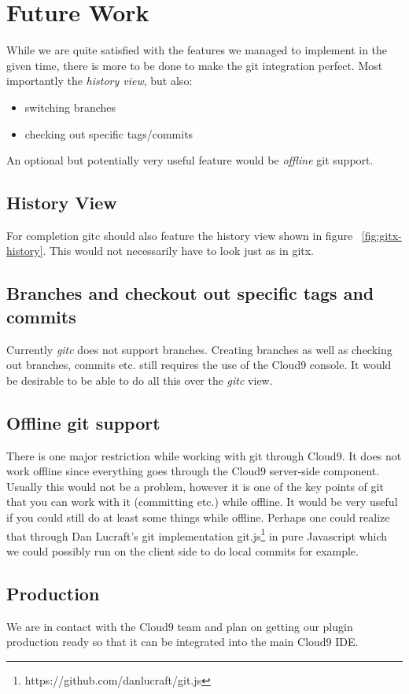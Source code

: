 \section{Future Work}
\label{sec:Future_Work}

While we are quite satisfied with the features we managed to implement in the given time,
there is more to be done to make the git integration perfect.
Most importantly the \emph{history view}, but also:
\begin{itemize}
	\item switching branches
	\item checking out specific tags/commits
\end{itemize}
An optional but potentially very useful feature would be \emph{offline} git support.

\subsection{History View}
\label{sec:history-view}

For completion gitc should also feature the history view shown in figure ~\ref{fig:gitx-history}.
This would not necessarily have to look just as in gitx.

\subsection{Branches and checkout out specific tags and commits}
\label{sec:branches}

Currently \emph{gitc} does not support branches. Creating branches as well as checking out branches,
commits etc. still requires the use of the Cloud9 console. It would be desirable to be able to do all
this over the \emph{gitc} view.

\subsection{Offline git support}
\label{sec:offline-git-support}

There is one major restriction while working with git through Cloud9. It does not work offline since everything goes through the Cloud9 server-side component.
Usually this would not be a problem, however it is one of the key points of git that you can work with it (committing etc.)
while offline.
It would be very useful if you could still do at least some things while offline.
Perhaps one could realize that through Dan Lucraft's git implementation git.js\footnote{https://github.com/danlucraft/git.js} in pure Javascript which we could possibly run on the client side to do local commits for example.

\subsection{Production}
We are in contact with the Cloud9 team and plan on getting our plugin production ready so that it can be integrated into the main Cloud9 IDE.